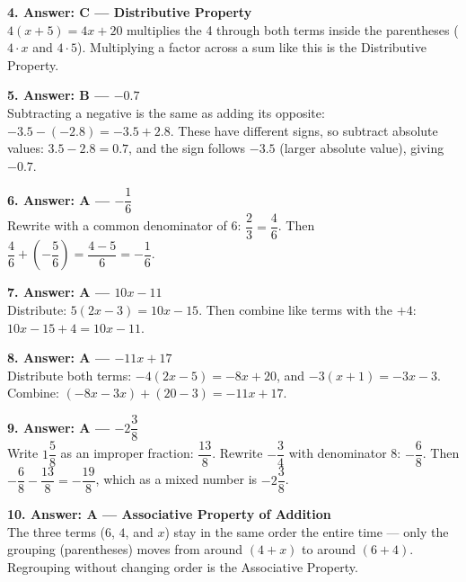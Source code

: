 \documentclass[11pt]{article}
\begin{document}
\vspace{6pt}\noindent\textbf{4. Answer: C --- Distributive Property}\\
\hspace*{1em}$4(x+5)=4x+20$ multiplies the 4 through both terms inside the parentheses ($4\cdot x$ and $4\cdot5$). Multiplying a factor across a sum like this is the Distributive Property.

\vspace{6pt}\noindent\textbf{5. Answer: B --- $-0.7$}\\
\hspace*{1em}Subtracting a negative is the same as adding its opposite: $-3.5-(-2.8)=-3.5+2.8$. These have different signs, so subtract absolute values: $3.5-2.8=0.7$, and the sign follows $-3.5$ (larger absolute value), giving $-0.7$.

\vspace{6pt}\noindent\textbf{6. Answer: A --- $-\dfrac{1}{6}$}\\
\hspace*{1em}Rewrite with a common denominator of 6: $\dfrac{2}{3}=\dfrac{4}{6}$. Then $\dfrac{4}{6}+\left(-\dfrac{5}{6}\right)=\dfrac{4-5}{6}=-\dfrac{1}{6}$.

\vspace{6pt}\noindent\textbf{7. Answer: A --- $10x-11$}\\
\hspace*{1em}Distribute: $5(2x-3)=10x-15$. Then combine like terms with the $+4$: $10x-15+4=10x-11$.

\vspace{6pt}\noindent\textbf{8. Answer: A --- $-11x+17$}\\
\hspace*{1em}Distribute both terms: $-4(2x-5)=-8x+20$, and $-3(x+1)=-3x-3$. Combine: $(-8x-3x)+(20-3)=-11x+17$.

\vspace{6pt}\noindent\textbf{9. Answer: A --- $-2\dfrac{3}{8}$}\\
\hspace*{1em}Write $1\dfrac{5}{8}$ as an improper fraction: $\dfrac{13}{8}$. Rewrite $-\dfrac{3}{4}$ with denominator 8: $-\dfrac{6}{8}$. Then $-\dfrac{6}{8}-\dfrac{13}{8}=-\dfrac{19}{8}$, which as a mixed number is $-2\dfrac{3}{8}$.

\vspace{6pt}\noindent\textbf{10. Answer: A --- Associative Property of Addition}\\
\hspace*{1em}The three terms ($6$, $4$, and $x$) stay in the same order the entire time --- only the grouping (parentheses) moves from around $(4+x)$ to around $(6+4)$. Regrouping without changing order is the Associative Property.
\end{document}
